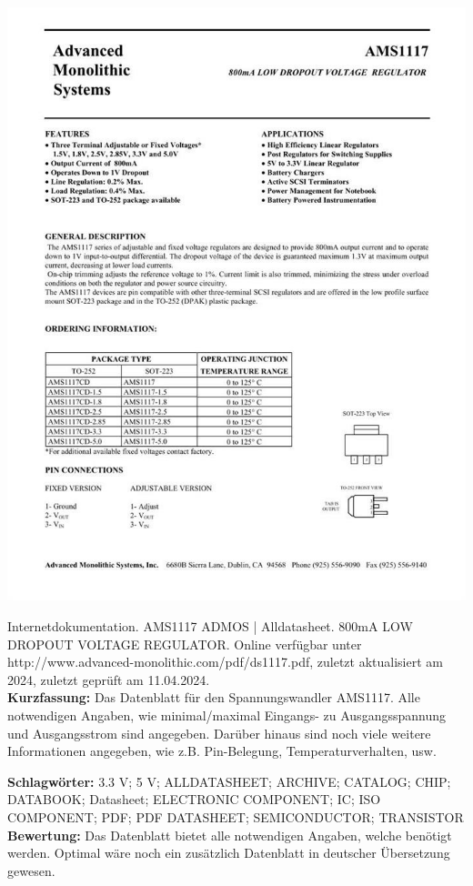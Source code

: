 %
%

{
\begin{minipage}{0.38\textwidth}
	\includegraphics[width=\linewidth]{images/AMS.jpg}
\end{minipage}
\hfill
\begin{minipage}{0.6\textwidth}
Internetdokumentation. AMS1117 ADMOS | Alldatasheet. 800mA LOW DROPOUT VOLTAGE REGULATOR.
Online verfügbar unter http://www.advanced-monolithic.com/pdf/ds1117.pdf, zuletzt aktualisiert am 2024, zuletzt geprüft am 11.04.2024.
\\ \textbf{Kurzfassung:}
Das Datenblatt für den Spannungswandler AMS1117. Alle notwendigen Angaben, wie minimal/maximal Eingangs- zu Ausgangsspannung und Ausgangsstrom sind angegeben. Darüber hinaus sind noch viele weitere Informationen angegeben, wie z.B. Pin-Belegung, Temperaturverhalten, usw.
\end{minipage}
\textbf{Schlagwörter:}
3.3 V; 5 V; ALLDATASHEET; ARCHIVE; CATALOG; CHIP; DATABOOK; Datasheet; ELECTRONIC COMPONENT; IC; ISO COMPONENT; PDF; PDF DATASHEET; SEMICONDUCTOR; TRANSISTOR
\textbf{Bewertung:}
Das Datenblatt bietet alle notwendigen Angaben, welche benötigt werden. Optimal wäre noch ein zusätzlich Datenblatt in deutscher Übersetzung gewesen.
}


